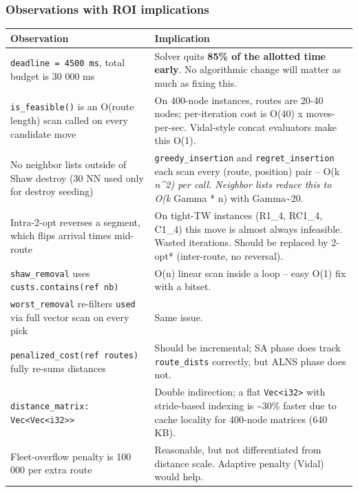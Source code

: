 \documentclass[twocolumn,10pt,letterpaper]{article}
\begin{document}
\subsubsection{Observations with ROI implications}

\vspace{0.4em}
\noindent
\small
\begin{tabularx}{\columnwidth}{@{}XX@{}}
\toprule
\textbf{Observation} & \textbf{Implication} \\
\midrule
\texttt{deadline = 4500 ms}, total budget is 30 000 ms & Solver quits \textbf{85\% of the allotted time early}. No algorithmic change will matter as much as fixing this. \\
\texttt{is\_feasible()} is an O(route length) scan called on every candidate move & On 400-node instances, routes are 20-40 nodes; per-iteration cost is O(40) x moves-per-sec. Vidal-style concat evaluators make this O(1). \\
No neighbor lists outside of Shaw destroy (30 NN used only for destroy seeding) & \texttt{greedy\_insertion} and \texttt{regret\_insertion} each scan every (route, position) pair -- O(k \textit{ n\^{}2) per call. Neighbor lists reduce this to O(k } Gamma * n) with Gamma\textasciitilde{}20. \\
Intra-2-opt reverses a segment, which flips arrival times mid-route & On tight-TW instances (R1\_4, RC1\_4, C1\_4) this move is almost always infeasible. Wasted iterations. Should be replaced by 2-opt* (inter-route, no reversal). \\
\texttt{shaw\_removal} uses \texttt{custs.contains(ref nb)} & O(n) linear scan inside a loop -- easy O(1) fix with a bitset. \\
\texttt{worst\_removal} re-filters \texttt{used} via full vector scan on every pick & Same issue. \\
\texttt{penalized\_cost(ref routes)} fully re-sums distances & Should be incremental; SA phase does track \texttt{route\_dists} correctly, but ALNS phase does not. \\
\texttt{distance\_matrix: Vec<Vec<i32>>} & Double indirection; a flat \texttt{Vec<i32>} with stride-based indexing is \textasciitilde{}30\% faster due to cache locality for 400-node matrices (640 KB). \\
Fleet-overflow penalty is 100 000 per extra route & Reasonable, but not differentiated from distance scale. Adaptive penalty (Vidal) would help. \\
\bottomrule
\end{tabularx}
\vspace{0.4em}
\end{document}
